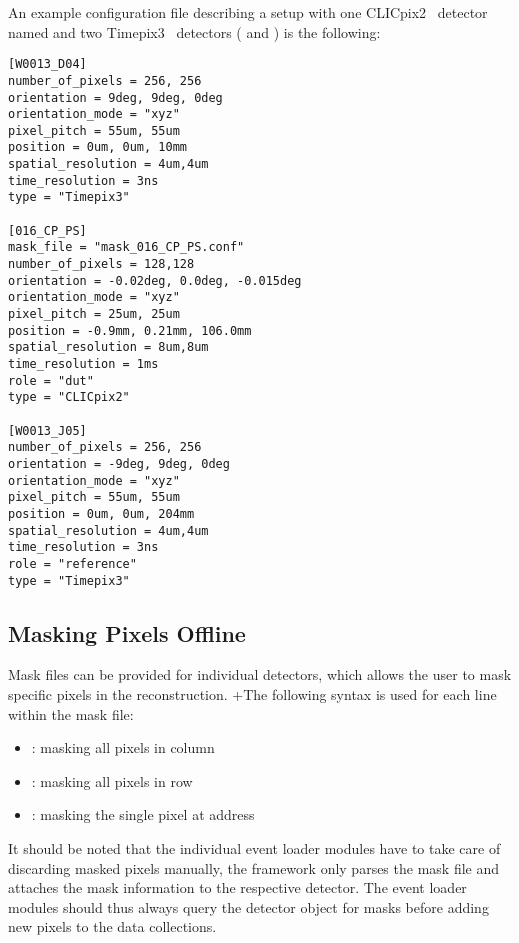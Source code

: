 An example configuration file describing a setup with one CLICpix2~\cite{clicpix2,clicpix2-pisa} detector named  and two Timepix3~\cite{timepix3} detectors ( and ) is the following:

\begin{verbatim}
[W0013_D04]
number_of_pixels = 256, 256
orientation = 9deg, 9deg, 0deg
orientation_mode = "xyz"
pixel_pitch = 55um, 55um
position = 0um, 0um, 10mm
spatial_resolution = 4um,4um
time_resolution = 3ns
type = "Timepix3"

[016_CP_PS]
mask_file = "mask_016_CP_PS.conf"
number_of_pixels = 128,128
orientation = -0.02deg, 0.0deg, -0.015deg
orientation_mode = "xyz"
pixel_pitch = 25um, 25um
position = -0.9mm, 0.21mm, 106.0mm
spatial_resolution = 8um,8um
time_resolution = 1ms
role = "dut"
type = "CLICpix2"

[W0013_J05]
number_of_pixels = 256, 256
orientation = -9deg, 9deg, 0deg
orientation_mode = "xyz"
pixel_pitch = 55um, 55um
position = 0um, 0um, 204mm
spatial_resolution = 4um,4um
time_resolution = 3ns
role = "reference"
type = "Timepix3"
\end{verbatim}

\subsection{Masking Pixels Offline}
\label{sec:masking}

Mask files can be provided for individual detectors, which allows the user to mask specific pixels in the reconstruction.
+The following syntax is used for each line within the mask file:
\begin{itemize}
    \item {}: masking all pixels in column 
    \item {}: masking all pixels in row 
    \item {}: masking the single pixel at address 
\end{itemize}

\begin{warning}
It should be noted that the individual event loader modules have to take care of discarding masked pixels manually, the \corry framework only parses the mask file and attaches the mask information to the respective detector. The event loader modules should thus always query the detector object for masks before adding new pixels to the data collections.
\end{warning}

